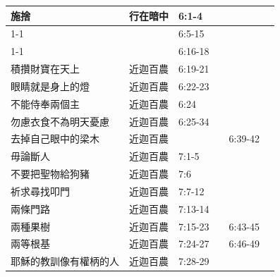\begin{table}[H]
\begin{tabular}{p{13.07em}|p{8.43em}|p{5.285em}|p{5.57em}|p{5.285em}|p{4.855em}}
施捨&\multicolumn{1}{l|}{\multirow{3}{*}{行在暗中}}& 6:1-4& \multicolumn{1}{r|}{} & \multicolumn{1}{r|}{} & \multicolumn{1}{r}{} \\  
\cmidrule{1-1}\cmidrule{3-6}{禱告}&   & 6:5-15& \multicolumn{1}{r|}{} & \multicolumn{1}{r|}{} & \multicolumn{1}{r}{} \\  
\cmidrule{1-1}\cmidrule{3-6}{禁食}&  & 6:16-18& \multicolumn{1}{r|}{} & \multicolumn{1}{r|}{} & \multicolumn{1}{r}{} \\    \midrule

積攢財寶在天上& 近迦百農  & 6:19-21& \multicolumn{1}{r|}{} & \multicolumn{1}{r|}{} & \multicolumn{1}{r}{} \\    \midrule
眼睛就是身上的燈& 近迦百農  & 6:22-23 & \multicolumn{1}{r|}{} & \multicolumn{1}{r|}{} & \multicolumn{1}{r}{} \\    \midrule
不能侍奉兩個主& 近迦百農  & 6:24 & \multicolumn{1}{r|}{} & \multicolumn{1}{r|}{} & \multicolumn{1}{r}{} \\    \midrule
勿慮衣食不為明天憂慮& 近迦百農  & 6:25-34 & \multicolumn{1}{r|}{} & \multicolumn{1}{r|}{} & \multicolumn{1}{r}{} \\    \midrule

去掉自己眼中的梁木& 近迦百農  &  & \multicolumn{1}{r|}{} & \multicolumn{1}{l|}{6:39-42} & \multicolumn{1}{r}{} \\    \midrule

毋論斷人& 近迦百農  & 7:1-5 & \multicolumn{1}{r|}{} & \multicolumn{1}{r|}{} & \multicolumn{1}{r}{} \\    \midrule
不要把聖物給狗豬& 近迦百農  & 7:6 & \multicolumn{1}{r|}{} & \multicolumn{1}{r|}{} & \multicolumn{1}{r}{} \\    \midrule
祈求尋找叩門& 近迦百農  & 7:7-12 & \multicolumn{1}{r|}{} & \multicolumn{1}{r|}{} & \multicolumn{1}{r}{} \\    \midrule
兩條門路& 近迦百農  & 7:13-14 & \multicolumn{1}{r|}{} & \multicolumn{1}{r|}{} & \multicolumn{1}{r}{} \\    \midrule
兩種果樹& 近迦百農  & 7:15-23 & \multicolumn{1}{r|}{} & \multicolumn{1}{l|}{6:43-45} & \multicolumn{1}{r}{} \\    \midrule
兩等根基& 近迦百農  & 7:24-27 & \multicolumn{1}{r|}{} & \multicolumn{1}{l|}{6:46-49} & \multicolumn{1}{r}{} \\    \midrule
耶穌的教訓像有權柄的人& 近迦百農  & 7:28-29& \multicolumn{1}{r|}{} & \multicolumn{1}{r|}{} & \multicolumn{1}{r}{} \\    \midrule


\end{tabular}
\end{table}
